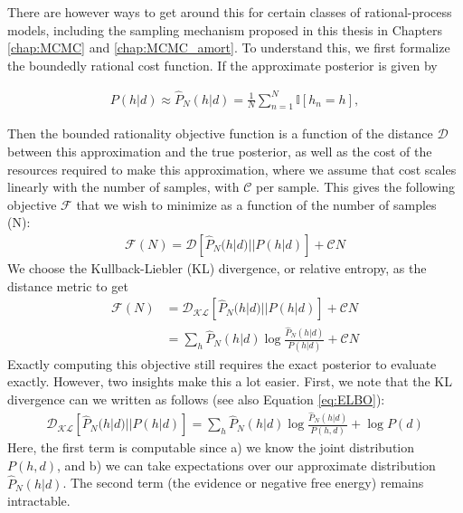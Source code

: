 There are however ways to get around this for certain classes of rational-process models, including the sampling mechanism proposed in this thesis in Chapters \ref{chap:MCMC} and \ref{chap:MCMC_amort}. To understand this, we first formalize the boundedly rational cost function. If the approximate posterior is given by

\begin{align}
P(h|d) \approx \hat{P}_N(h|d) = \frac{1}{N}\sum_{n=1}^N \mathbb{I}[h_n=h],
\end{align}

Then the bounded rationality objective function is a function of the distance $\mathcal{D}$ between this approximation and the true posterior, as well as the cost of the resources required to make this approximation, where we assume that cost scales linearly with the number of samples, with $\mathcal{C}$ per sample. This gives the following objective $\mathcal{F}$ that we wish to minimize as a function of the number of samples (N):
\begin{align}
\mathcal{F}(N) = \mathcal{D}[\hat{P}_N(h|d)||P(h|d)] + \mathcal{C}N
\end{align}
We choose the Kullback-Liebler (KL) divergence, or relative entropy, as the distance metric to get
\begin{align}
\mathcal{F}(N) &= \mathcal{D_{KL}}[\hat{P}_N(h|d)||P(h|d)] + \mathcal{C}N \\
& =  \sum_h \hat{P}_N(h|d) \log \frac{\hat{P}_N(h|d)}{P(h|d)} + \mathcal{C}N
\end{align}
Exactly computing this objective still requires the exact posterior to evaluate exactly. However, two insights make this a lot easier. First, we note that the KL divergence can we written as follows (see also Equation \ref{eq:ELBO}):
\begin{align}
\mathcal{D_{KL}}[\hat{P}_N(h|d)||P(h|d)]  = \sum_h \hat{P}_N(h|d) \log \frac{\hat{P}_N(h|d)}{P(h,d)} + \log P(d)
\label{eq:split_KL}
\end{align}
Here, the first term is computable since a) we know the joint distribution $P(h,d)$,  and b) we can take expectations over our approximate distribution $\hat{P}_N(h|d)$. The second term (the evidence or negative free energy) remains intractable. 

